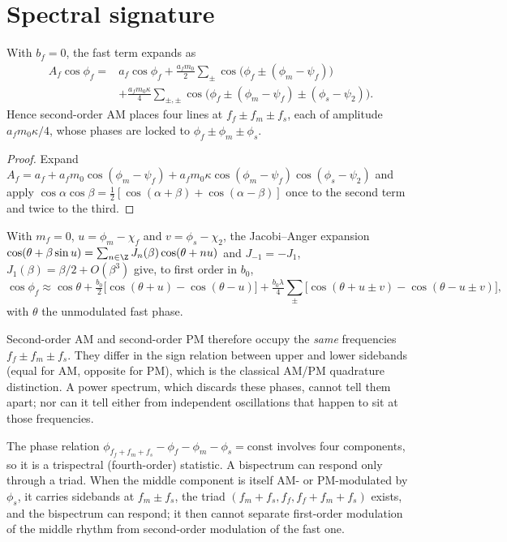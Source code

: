 \section{Spectral signature}
\begin{proposition}
\label{prop:som-am-lines}
With $b_f=0$, the fast term expands as
\begin{align*}
A_f\cos\phi_f={}&a_f\cos\phi_f
+\tfrac{a_fm_0}{2}\sum_{\pm}\cos\bigl(\phi_f\pm(\phi_m-\psi_f)\bigr)\\
&+\tfrac{a_fm_0\kappa}{4}\sum_{\pm,\pm}
\cos\bigl(\phi_f\pm(\phi_m-\psi_f)\pm(\phi_s-\psi_2)\bigr).
\end{align*}
Hence second-order AM places four lines at $f_f\pm f_m\pm f_s$, each of
amplitude $a_fm_0\kappa/4$, whose phases are locked to
$\phi_f\pm\phi_m\pm\phi_s$.
\end{proposition}
\begin{proof}
Expand $A_f=a_f+a_fm_0\cos(\phi_m-\psi_f)
+a_fm_0\kappa\cos(\phi_m-\psi_f)\cos(\phi_s-\psi_2)$ and apply
$\cos\alpha\cos\beta=\tfrac12[\cos(\alpha+\beta)+\cos(\alpha-\beta)]$
once to the second term and twice to the third.
\end{proof}

\begin{proposition}
With $m_f=0$, $u=\phi_m-\chi_f$ and $v=\phi_s-\chi_2$, the Jacobi--Anger
expansion $\cos(\theta+\beta\sin u)=\sum_{n\in\Z}J_n(\beta)\cos(\theta+nu)$
and $J_{-1}=-J_1$, $J_1(\beta)=\beta/2+O(\beta^3)$ give, to first order in
$b_0$,
\[
\cos\phi_f\approx\cos\theta
+\tfrac{b_0}{2}\bigl[\cos(\theta+u)-\cos(\theta-u)\bigr]
+\tfrac{b_0\lambda}{4}\sum_{\pm}\bigl[\cos(\theta+u\pm v)-\cos(\theta-u\pm v)\bigr],
\]
with $\theta$ the unmodulated fast phase.
\end{proposition}
Second-order AM and second-order PM therefore occupy the \emph{same}
frequencies $f_f\pm f_m\pm f_s$. They differ in the sign relation between
upper and lower sidebands (equal for AM, opposite for PM), which is the
classical AM/PM quadrature distinction. A power spectrum, which discards
these phases, cannot tell them apart; nor can it tell either from
independent oscillations that happen to sit at those frequencies.

The phase relation $\phi_{f_f+f_m+f_s}-\phi_f-\phi_m-\phi_s=\text{const}$
involves four components, so it is a trispectral (fourth-order)
statistic. A bispectrum can respond only through a triad. When the middle
component is itself AM- or PM-modulated by $\phi_s$, it carries sidebands
at $f_m\pm f_s$, the triad $(f_m+f_s,f_f,f_f+f_m+f_s)$ exists, and the
bispectrum can respond; it then cannot separate first-order modulation of
the middle rhythm from second-order modulation of the fast one.

